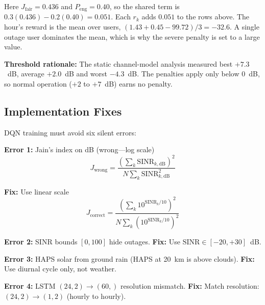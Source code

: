 \documentclass[conference]{IEEEtran}
\begin{document}
\begin{center}
\end{center}

\noindent Here $J_\mathrm{fair}=0.436$ and $P_\mathrm{eng}=0.40$, so the shared term is $0.3(0.436)-0.2(0.40)=0.051$. Each $r_k$ adds $0.051$ to the rows above. The hour's reward is the mean over users, $(1.43+0.45-99.72)/3=-32.6$. A single outage user dominates the mean, which is why the severe penalty is set to a large value.

\noindent \textbf{Threshold rationale:} The static channel-model analysis measured best $+7.3$~dB, average $+2.0$~dB and worst $-4.3$~dB. The penalties apply only below $0$~dB, so normal operation ($+2$ to $+7$~dB) earns no penalty.


\subsection{Implementation Fixes}

DQN training must avoid six silent errors:

\textbf{Error 1:} Jain's index on dB (wrong---log scale)
\begin{equation}
J_{\text{wrong}} = \frac{(\sum_k \text{SINR}_{k,\text{dB}})^2}{N \sum_k \text{SINR}_{k,\text{dB}}^2}
\end{equation}

\textbf{Fix:} Use linear scale
\begin{equation}
J_{\text{correct}} = \frac{(\sum_k 10^{\text{SINR}_k/10})^2}{N \sum_k (10^{\text{SINR}_k/10})^2}
\end{equation}

\textbf{Error 2:} SINR bounds $[0,100]$ hide outages.
\textbf{Fix:} Use $\text{SINR} \in [-20,+30]$~dB.

\textbf{Error 3:} HAPS solar from ground rain (HAPS at 20~km is above clouds).
\textbf{Fix:} Use diurnal cycle only, not weather.

\textbf{Error 4:} LSTM $(24,2) \to (60,)$ resolution mismatch.
\textbf{Fix:} Match resolution: $(24,2) \to (1,2)$ (hourly to hourly).
\end{document}
